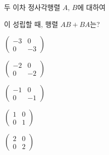두 이차 정사각행렬 $A$, $B$에 대하여\par\smallskip{}\par\smallskip\noindent 이 성립할 때, 행렬 $AB+BA$는?
\begin{choicesii}{\rule[-3.0ex]{0pt}{8.0ex}$\begin{pmatrix} -3 & 0 \\ 0 & -3 \end{pmatrix}$}{\rule[-3.0ex]{0pt}{8.0ex}$\begin{pmatrix} -2 & 0 \\ 0 & -2 \end{pmatrix}$}{\rule[-3.0ex]{0pt}{8.0ex}$\begin{pmatrix} -1 & 0 \\ 0 & -1 \end{pmatrix}$}{\rule[-3.0ex]{0pt}{8.0ex}$\begin{pmatrix} 1 & 0 \\ 0 & 1 \end{pmatrix}$}{\rule[-3.0ex]{0pt}{8.0ex}$\begin{pmatrix} 2 & 0 \\ 0 & 2 \end{pmatrix}$}\end{choicesii}
